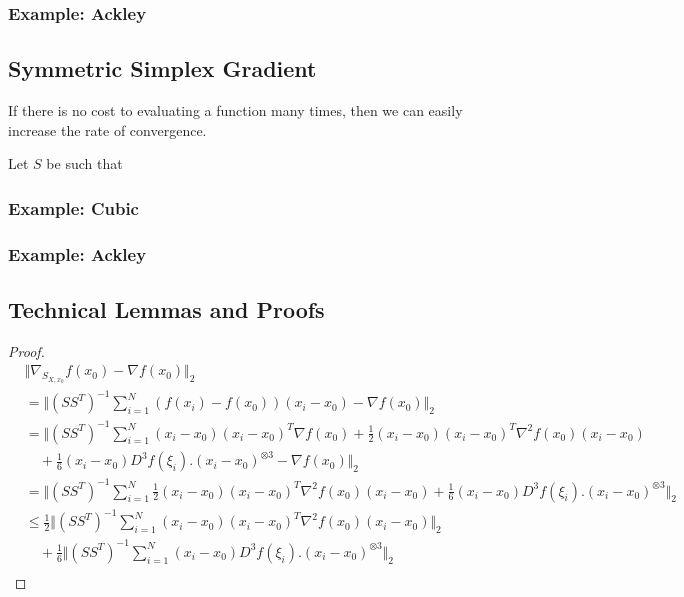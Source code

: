 \subsubsection{Example: Ackley}


\subsection{Symmetric Simplex Gradient}
If there is no cost to evaluating a function many times, then we can easily increase the rate of convergence. 

\begin{lemma}
Let $S$ be such that 
\end{lemma}

\subsubsection{Example: Cubic}
\subsubsection{Example: Ackley}






\subsection{Technical Lemmas and Proofs}

\begin{proof}
\begin{align}
    &\Vert \nabla_{S_{X, x_0}} f(x_0) - \nabla f(x_0) \Vert_2 \\
    &= \Vert (SS^T)^{-1} \sum_{i = 1}^N (f(x_i) - f(x_0)) (x_i - x_0) - \nabla f(x_0) \Vert_2 \\
    &= \Vert (SS^T)^{-1} \sum_{i = 1}^N (x_i - x_0) (x_i - x_0)^T \nabla f(x_0) + \frac{1}{2} (x_i - x_0) (x_i - x_0)^T \nabla^2 f(x_0) (x_i - x_0)  \\
    &\quad  + \frac{1}{6} (x_i - x_0) D^3 f(\xi_i).(x_i - x_0)^{\otimes 3} - \nabla f(x_0) \Vert_2 \\
    &= \Vert (SS^T)^{-1} \sum_{i = 1}^N \frac{1}{2} (x_i - x_0) (x_i - x_0)^T \nabla^2 f(x_0) (x_i - x_0) + \frac{1}{6} (x_i - x_0) D^3 f(\xi_i).(x_i - x_0)^{\otimes 3} \Vert_2 \\
    &\leq \frac{1}{2} \Vert (SS^T)^{-1} \sum_{i = 1}^N (x_i - x_0) (x_i - x_0)^T \nabla^2 f(x_0) (x_i - x_0) \Vert_2 \\
    &\quad + \frac{1}{6} \Vert (SS^T)^{-1} \sum_{i = 1}^N (x_i - x_0) D^3 f(\xi_i).(x_i - x_0)^{\otimes 3} \Vert_2 \\
\end{align}
\end{proof}


